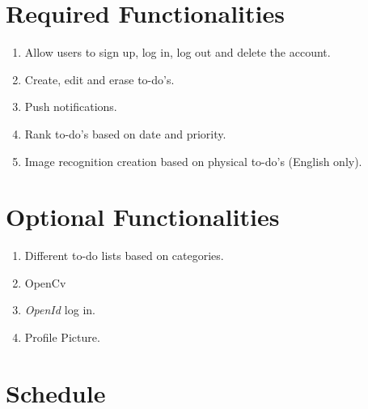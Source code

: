 \documentclass[12pt]{paper}
\begin{document}
		
	\section{Required Functionalities}
		\begin{enumerate}
			\item Allow users to sign up, log in, log out and delete the account.
			\item Create, edit and erase to-do's. 
			\item Push notifications.
			\item Rank to-do's based on date and priority.
			\item Image recognition creation based on physical to-do's (English only).
		\end{enumerate}
	
	\section{Optional Functionalities}
		\begin{enumerate}
			\item Different to-do lists based on categories.
			\item OpenCv
			\item \textit{OpenId \cite{openid}} log in.
			\item Profile Picture.
		\end{enumerate}
	\bigskip
	\section{Schedule}
	\pagebreak
	
	
\end{document}
